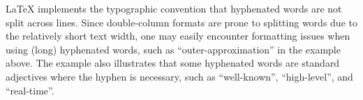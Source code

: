


\noindent \LaTeX{} implements the typographic convention that hyphenated words are not split across lines.
Since double-column formats are prone to splitting words due to the relatively short text width, one may easily encounter formatting issues when using (long) hyphenated words, such as ``outer-approximation'' in the example above.
The example also illustrates that some hyphenated words are standard adjectives where the hyphen is necessary, such as ``well-known'', ``high-level'', and ``real-time''.
